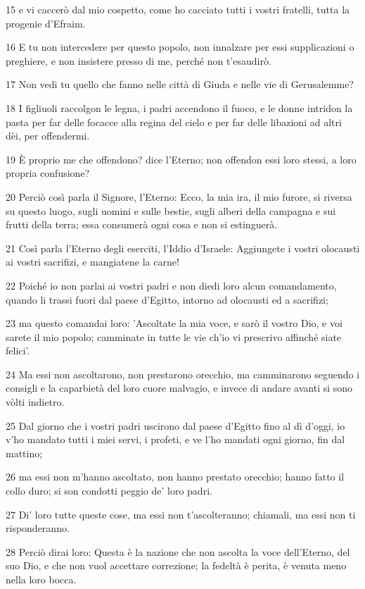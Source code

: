 \par 15 e vi caccerò dal mio cospetto, come ho cacciato tutti i vostri fratelli, tutta la progenie d'Efraim.
\par 16 E tu non intercedere per questo popolo, non innalzare per essi supplicazioni o preghiere, e non insistere presso di me, perché non t'esaudirò.
\par 17 Non vedi tu quello che fanno nelle città di Giuda e nelle vie di Gerusalemme?
\par 18 I figliuoli raccolgon le legna, i padri accendono il fuoco, e le donne intridon la pasta per far delle focacce alla regina del cielo e per far delle libazioni ad altri dèi, per offendermi.
\par 19 È proprio me che offendono? dice l'Eterno; non offendon essi loro stessi, a loro propria confusione?
\par 20 Perciò così parla il Signore, l'Eterno: Ecco, la mia ira, il mio furore, si riversa su questo luogo, sugli uomini e sulle bestie, sugli alberi della campagna e sui frutti della terra; essa consumerà ogni cosa e non si estinguerà.
\par 21 Così parla l'Eterno degli eserciti, l'Iddio d'Israele: Aggiungete i vostri olocausti ai vostri sacrifizi, e mangiatene la carne!
\par 22 Poiché io non parlai ai vostri padri e non diedi loro alcun comandamento, quando li trassi fuori dal paese d'Egitto, intorno ad olocausti ed a sacrifizi;
\par 23 ma questo comandai loro: 'Ascoltate la mia voce, e sarò il vostro Dio, e voi sarete il mio popolo; camminate in tutte le vie ch'io vi prescrivo affinché siate felici'.
\par 24 Ma essi non ascoltarono, non prestarono orecchio, ma camminarono seguendo i consigli e la caparbietà del loro cuore malvagio, e invece di andare avanti si sono vòlti indietro.
\par 25 Dal giorno che i vostri padri uscirono dal paese d'Egitto fino al dì d'oggi, io v'ho mandato tutti i miei servi, i profeti, e ve l'ho mandati ogni giorno, fin dal mattino;
\par 26 ma essi non m'hanno ascoltato, non hanno prestato orecchio; hanno fatto il collo duro; si son condotti peggio de' loro padri.
\par 27 Di' loro tutte queste cose, ma essi non t'ascolteranno; chiamali, ma essi non ti risponderanno.
\par 28 Perciò dirai loro: Questa è la nazione che non ascolta la voce dell'Eterno, del suo Dio, e che non vuol accettare correzione; la fedeltà è perita, è venuta meno nella loro bocca.
